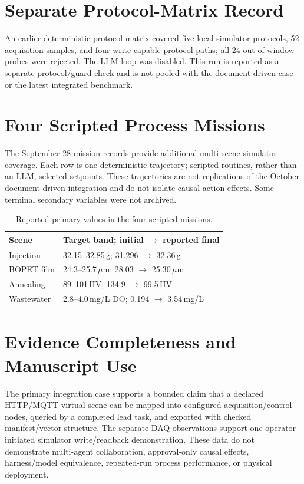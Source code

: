 \documentclass[journal]{IEEEtran}
\begin{document}
\section{Separate Protocol-Matrix Record}
An earlier deterministic protocol matrix covered five local simulator
protocols, 52 acquisition samples, and four write-capable protocol paths; all
24 out-of-window probes were rejected. The LLM loop was disabled. This run is
reported as a separate protocol/guard check and is not pooled with the
document-driven case or the latest integrated benchmark.

\section{Four Scripted Process Missions}
The September 28 mission records provide additional multi-scene simulator
coverage. Each row is one deterministic trajectory; scripted routines, rather
than an LLM, selected setpoints. These trajectories are not replications of
the October document-driven integration and do not isolate causal action
effects. Some terminal secondary variables were not archived.

\begin{table}[!t]
\centering
\caption{Reported primary values in the four scripted missions.}
\label{tab:s5-missions}
\footnotesize
\setlength{\tabcolsep}{3pt}
\begin{tabularx}{\columnwidth}{@{}>{\raggedright\arraybackslash}p{1.28cm}X@{}}
\toprule
Scene & Target band; initial $\rightarrow$ reported final \\
\midrule
Injection & 32.15--32.85\,g; 31.296 $\rightarrow$ 32.36\,g \\
BOPET film & 24.3--25.7\,$\mu$m; 28.03 $\rightarrow$ 25.30\,$\mu$m \\
Annealing & 89--101\,HV; 134.9 $\rightarrow$ 99.5\,HV \\
Wastewater & 2.8--4.0\,mg/L DO; 0.194 $\rightarrow$ 3.54\,mg/L \\
\bottomrule
\end{tabularx}
\end{table}

\section{Evidence Completeness and Manuscript Use}
The primary integration case supports a bounded claim that a declared
HTTP/MQTT virtual scene can be mapped into configured acquisition/control
nodes, queried by a completed lead task, and exported with checked
manifest/vector structure. The separate DAQ observations support one
operator-initiated simulator write/readback demonstration. These data do not demonstrate
multi-agent collaboration, approval-only causal effects, harness/model
equivalence, repeated-run process performance, or physical deployment.
\end{document}

